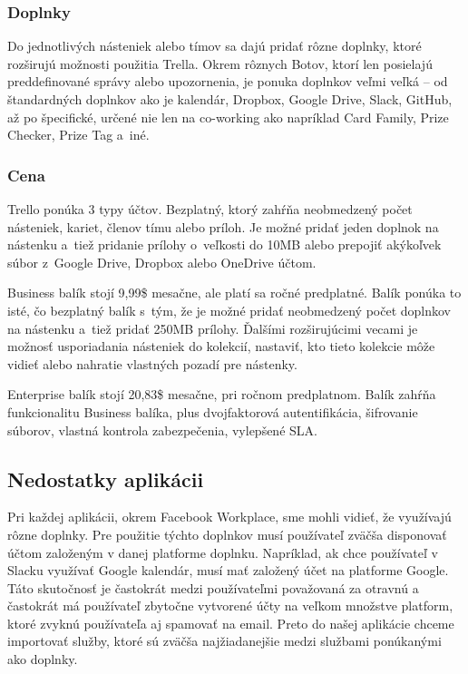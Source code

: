 \subsubsection{Doplnky}
\indent Do jednotlivých násteniek alebo tímov sa dajú pridať rôzne doplnky, ktoré rozširujú možnosti použitia Trella. Okrem rôznych Botov, ktorí len posielajú preddefinované správy alebo upozornenia, je ponuka doplnkov veľmi veľká – od štandardných doplnkov ako je kalendár, Dropbox, Google Drive, Slack, GitHub, až po špecifické, určené nie len na co-working ako napríklad Card Family, Prize Checker, Prize Tag a iné. 
\subsubsection{Cena}
\indent Trello ponúka 3 typy účtov. Bezplatný, ktorý zahŕňa neobmedzený počet násteniek, kariet, členov tímu alebo príloh. Je možné pridať jeden doplnok na nástenku a tiež pridanie prílohy o veľkosti do 10MB alebo prepojiť akýkoľvek súbor z Google Drive, Dropbox alebo OneDrive účtom. 

\indent Business balík stojí 9,99\$ mesačne, ale platí sa ročné predplatné. Balík ponúka to isté, čo bezplatný balík s tým, že je možné pridať neobmedzený počet doplnkov na nástenku a tiež pridať 250MB prílohy. Ďalšími rozširujúcimi vecami je možnosť usporiadania násteniek do kolekcií, nastaviť, kto tieto kolekcie môže vidieť alebo nahratie vlastných pozadí pre nástenky. 

\indent Enterprise balík stojí 20,83\$ mesačne, pri ročnom predplatnom. Balík zahŕňa funkcionalitu Business balíka, plus dvojfaktorová autentifikácia, šifrovanie súborov, vlastná kontrola zabezpečenia, vylepšené SLA\cite{trello}. 

\subsection{Nedostatky aplikácii}
\indent Pri každej aplikácii, okrem Facebook Workplace, sme mohli vidieť, že využívajú rôzne doplnky. Pre použitie týchto doplnkov musí používateľ zväčša disponovať účtom založeným v danej platforme doplnku. Napríklad, ak chce používateľ v Slacku využívať Google kalendár, musí mať založený účet na platforme Google. Táto skutočnosť je častokrát medzi používateľmi považovaná za otravnú a častokrát má používateľ zbytočne vytvorené účty na veľkom množstve platform, ktoré zvyknú používateľa aj spamovať na email. Preto do našej aplikácie chceme importovať služby, ktoré sú zväčša najžiadanejšie medzi službami ponúkanými ako doplnky. 


